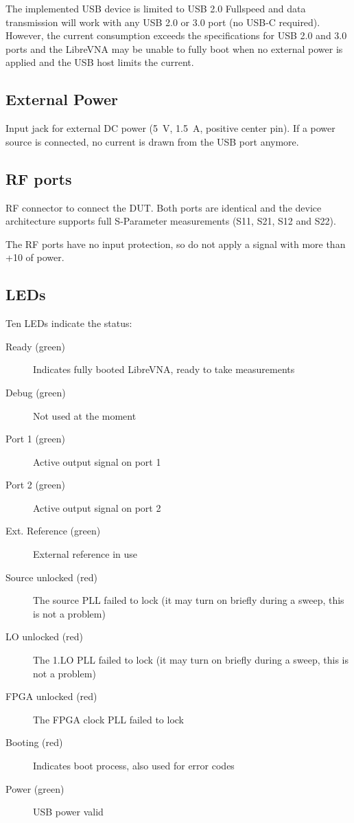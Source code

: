 \documentclass[a4paper,11pt]{article}
\newcommand\danger[1][5ex]{%
  \renewcommand\stacktype{L}%
  \scaleto{\stackon[1.3pt]{\color{red}$\triangle$}{\tiny !}}{#1}%
}
\newenvironment{important}[1][]{%
   \begin{mdframed}[%
      backgroundcolor={red!15}, hidealllines=true,
      skipabove=0.7\baselineskip, skipbelow=0.7\baselineskip,
      splitbottomskip=2pt, splittopskip=4pt, #1]%
   \makebox[0pt]{%
      \smash{%
         \hspace*{-45pt}%
         \raisebox{-5pt}{%
            {\danger}%
         }%
      }%
   }%
}{\end{mdframed}}
\newcommand{\vna}{LibreVNA}
\begin{document}
The implemented USB device is limited to USB 2.0 Fullspeed and data transmission will work with any USB 2.0 or 3.0 port (no USB-C required). However, the current consumption exceeds the specifications for USB 2.0 and 3.0 ports and the \vna{} may be unable to fully boot when no external power is applied and the USB host limits the current.
\subsection{External Power}
Input jack for external DC power (\SI{5}{\volt}, \SI{1.5}{\ampere}, positive center pin). If a power source is connected, no current is drawn from the USB port anymore.
\subsection{RF ports}
RF connector to connect the DUT. Both ports are identical and the device architecture supports full S-Parameter measurements (S11, S21, S12 and S22).
\begin{important}
The RF ports have no input protection, so do not apply a signal with more than +\SI{10}{\dBm} of power.
\end{important}
\subsection{LEDs}
Ten LEDs indicate the status:
\begin{description}
\item [Ready (green)] Indicates fully booted \vna{}, ready to take measurements
\item [Debug (green)] Not used at the moment
\item [Port 1 (green)] Active output signal on port 1
\item [Port 2 (green)] Active output signal on port 2
\item [Ext. Reference (green)] External reference in use
\item [Source unlocked (red)] The source PLL failed to lock (it may turn on briefly during a sweep, this is not a problem)
\item [LO unlocked (red)] The 1.LO PLL failed to lock (it may turn on briefly during a sweep, this is not a problem)
\item [FPGA unlocked (red)] The FPGA clock PLL failed to lock
\item [Booting (red)] Indicates boot process, also used for error codes
\item [Power (green)] USB power valid
\end{description}
\end{document}
